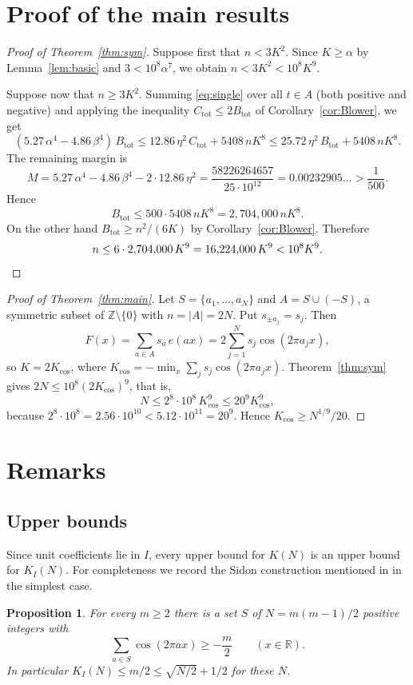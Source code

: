 \documentclass{amsart}
\newtheorem{proposition}[theorem]{Proposition}
\theoremstyle{remark}
\numberwithin{equation}{section}
\numberwithin{table}{section}
\newcommand{\Z}{\mathbb{Z}}
\newcommand{\R}{\mathbb{R}}
\newcommand{\Btot}{B_{\mathrm{tot}}}
\newcommand{\Ctot}{C_{\mathrm{tot}}}
\begin{document}
\section{Proof of the main results}\label{sec:proof}

\begin{proof}[Proof of Theorem~\ref{thm:sym}]
Suppose first that $n<3K^2$. Since $K\ge\alpha$ by Lemma~\ref{lem:basic} and $3<10^8\alpha^7$, we obtain $n<3K^2<10^8K^9$.

Suppose now that $n\ge3K^2$. Summing \eqref{eq:single} over all $t\in A$ (both positive and negative) and applying the inequality $\Ctot\le2\Btot$ of Corollary~\ref{cor:Blower}, we get
\[
(5.27\,\alpha^4-4.86\,\beta^4)\,\Btot\le12.86\,\eta^2\,\Ctot+5408\,nK^8\le25.72\,\eta^2\,\Btot+5408\,nK^8.
\]
The remaining margin is
\[
M=5.27\,\alpha^4-4.86\,\beta^4-2\cdot12.86\,\eta^2=\frac{58226264657}{25\cdot10^{12}}=0.00232905\ldots>\frac1{500}.
\]
Hence
\[
\Btot\le500\cdot5408\,nK^8=2{,}704{,}000\,nK^8.
\]
On the other hand $\Btot\ge n^2/(6K)$ by Corollary~\ref{cor:Blower}. Therefore
\[
n\le6\cdot2{,}704{,}000\,K^9=16{,}224{,}000\,K^9<10^8K^9.\qedhere
\]
\end{proof}

\begin{proof}[Proof of Theorem~\ref{thm:main}]
Let $S=\{a_1,\dots,a_N\}$ and $A=S\cup(-S)$, a symmetric subset of $\Z\setminus\{0\}$ with $n=|A|=2N$. Put $s_{\pm a_j}=s_j$. Then
\[
F(x)=\sum_{a\in A}s_a\,e(ax)=2\sum_{j=1}^Ns_j\cos(2\pi a_jx),
\]
so $K=2K_{\cos}$, where $K_{\cos}=-\min_x\sum_js_j\cos(2\pi a_jx)$. Theorem~\ref{thm:sym} gives $2N\le10^8(2K_{\cos})^9$, that is,
\[
N\le2^8\cdot10^8\,K_{\cos}^9\le20^9K_{\cos}^9,
\]
because $2^8\cdot10^8=2.56\cdot10^{10}<5.12\cdot10^{11}=20^9$. Hence $K_{\cos}\ge N^{1/9}/20$.
\end{proof}

\section{Remarks}\label{sec:remarks}

\subsection{Upper bounds}\label{sec:upper}
Since unit coefficients lie in $I$, every upper bound for $K(N)$ is an upper bound for $K_I(N)$. For completeness we record the Sidon construction mentioned in \cite[Section~1]{Bed} in the simplest case.

\begin{proposition}\label{prop:sidon}
For every $m\ge2$ there is a set $S$ of $N=m(m-1)/2$ positive integers with
\[
\sum_{a\in S}\cos(2\pi ax)\ge-\frac m2\qquad(x\in\R).
\]
In particular $K_I(N)\le m/2\le\sqrt{N/2}+1/2$ for these $N$.
\end{proposition}
\end{document}
